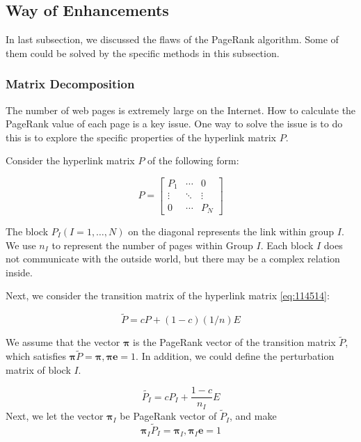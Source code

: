 \documentclass[lettersize,journal,12pt,conference]{IEEEtran}
\begin{document}
\subsection{Way of Enhancements}

In last subsection, we discussed the flaws of the PageRank algorithm. Some of them could be solved by the specific methods in this subsection.

\subsubsection{Matrix Decomposition}

The number of web pages is extremely large on the Internet. How to calculate the PageRank value of each page is a key issue. One way to solve the issue is to do this is to explore the specific properties of the hyperlink matrix $P$.

Consider the hyperlink matrix $P$ of the following form:

\begin{equation}
	\label{eq:114514}
	P=
	\begin{bmatrix}
		P_1    & \cdots & 0      \\
		\vdots & \ddots & \vdots \\
		0      & \cdots & P_N
	\end{bmatrix}
\end{equation}

The block $ P_I (I = 1, \ldots, N)$ on the diagonal represents the link within group $I$. We use $n_I$ to represent the number of pages within Group $I$. Each block $I$ does not communicate with the outside world, but there may be a complex relation inside.

Next, we consider the transition matrix of the hyperlink matrix \eqref{eq:114514}:

\begin{equation}
	\label{eq:114515}
	\widetilde{P} = cP  + (1-c)(1/n)E
\end{equation}

We assume that the vector $\boldsymbol{\pi}$ is the PageRank vector of the transition matrix $\widetilde{P}$, which satisfies $\boldsymbol{\pi}\widetilde{P}=\boldsymbol{\pi}, \boldsymbol{\pi e}=1$. In addition, we could define the perturbation matrix of block $I$.

\begin{equation}
	\widetilde{P_I}
	=cP_I + \frac{1-c}{n_I}E
\end{equation}
Next, we let the vector $\boldsymbol{\pi}_I$ be PageRank vector of $\widetilde{P}_I$, and make
\begin{equation}
	\boldsymbol{\pi}_I\widetilde{P}_I = \boldsymbol{\pi}_I, \boldsymbol{\pi}_I\boldsymbol{e}=1
\end{equation}
\end{document}
